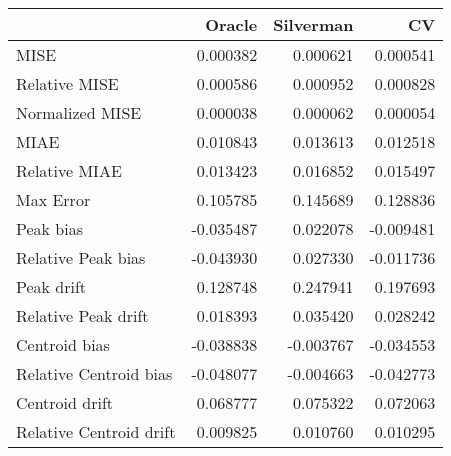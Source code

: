 \begin{tabular}{lrrr}
  \hline
 & Oracle & Silverman & CV \\ 
  \hline
MISE & 0.000382 & 0.000621 & 0.000541 \\ 
  Relative MISE & 0.000586 & 0.000952 & 0.000828 \\ 
  Normalized MISE & 0.000038 & 0.000062 & 0.000054 \\ 
  MIAE & 0.010843 & 0.013613 & 0.012518 \\ 
  Relative MIAE & 0.013423 & 0.016852 & 0.015497 \\ 
  Max Error & 0.105785 & 0.145689 & 0.128836 \\ 
  Peak bias & -0.035487 & 0.022078 & -0.009481 \\ 
  Relative Peak bias & -0.043930 & 0.027330 & -0.011736 \\ 
  Peak drift & 0.128748 & 0.247941 & 0.197693 \\ 
  Relative Peak drift & 0.018393 & 0.035420 & 0.028242 \\ 
  Centroid bias & -0.038838 & -0.003767 & -0.034553 \\ 
  Relative Centroid bias & -0.048077 & -0.004663 & -0.042773 \\ 
  Centroid drift & 0.068777 & 0.075322 & 0.072063 \\ 
  Relative Centroid drift & 0.009825 & 0.010760 & 0.010295 \\ 
   \hline
\end{tabular}
